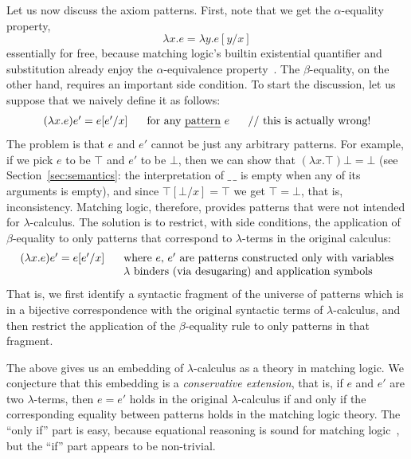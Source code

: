 \documentclass[UTF8,11pt]{article}
\theoremstyle{plain}
\theoremstyle{definition}
\theoremstyle{remark}
\begin{document}
Let us now discuss the axiom patterns.
First, note that we get the $\alpha$-equality property,
$$
\lambda x . e = \lambda y . e[y/x]
$$
essentially for free, because matching logic's builtin existential quantifier
and substitution already enjoy the $\alpha$-equivalence
property~\cite{rosu-2017-lmcs}.
The $\beta$-equality, on the other hand, requires an important side condition.
To start the discussion, let us suppose that we naively define it as follows:
$$
\begin{array}{r@{\hspace*{4ex}}l}
(\lambda x . e)e' = e[e'/x]
&
\textrm{for any \emph{pattern} $e$ \ \ \ \ // this is actually wrong!}
\end{array}
$$
The problem is that $e$ and $e'$ cannot be just any arbitrary patterns.
For example, if we pick $e$ to be $\top$ and $e'$ to be $\bot$, then
we can show that $(\lambda x . \top)\bot = \bot$
(see Section~\ref{sec:semantics}: the interpretation of $\_\,\_$ is empty
when any of its arguments is empty), and since $\top[\bot/x] = \top$ we
get $\top = \bot$, that is, inconsistency.
Matching logic, therefore, provides patterns that were not intended for
$\lambda$-calculus.
The solution is to restrict, with side conditions, the application of
$\beta$-equality to only patterns that correspond to $\lambda$-terms
in the original calculus:
$$
\begin{array}{r@{\hspace*{4ex}}l}
(\lambda x . e)e' = e[e'/x]
& \textrm{where $e$, $e'$ are patterns constructed only with variables}
\\
& \textrm{$\lambda$ binders (via desugaring) and application symbols}
\end{array}
$$
That is, we first identify a syntactic fragment of the universe of
patterns which is in a bijective correspondence with the original
syntactic terms of $\lambda$-calculus, and then restrict the
application of the $\beta$-equality rule to only patterns in that 
fragment.

The above gives us an embedding of $\lambda$-calculus as a theory
in matching logic.
We conjecture that this embedding is a \emph{conservative extension},
that is, if $e$ and $e'$ are two $\lambda$-terms, then $e=e'$ holds
in the original $\lambda$-calculus if and only if the corresponding
equality between patterns holds in the matching logic theory.
The ``only if'' part is easy, because equational reasoning is sound
for matching logic~\cite{rosu-2017-lmcs}, but the ``if'' part appears
to be non-trivial.
\end{document}
